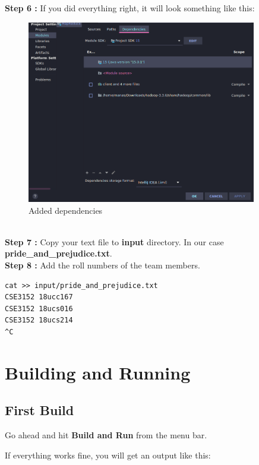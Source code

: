 \documentclass[10pt]{report}
\begin{document}
\textbf{Step 6 :} If you did everything right, it will look something like this:
\begin{figure}[h]
        \includegraphics[height=8cm]{dependency.png}
        \centering
        \caption{Added dependencies}
        \centering
\end{figure}
\\

\textbf{Step 7 :} Copy your text file to \textbf{input} directory. In our case \textbf{pride\_and\_prejudice.txt}.
\\

\textbf{Step 8 :} Add the roll numbers of the team members.

\begin{verbatim}
cat >> input/pride_and_prejudice.txt
CSE3152 18ucc167
CSE3152 18ucs016
CSE3152 18ucs214
^C
\end{verbatim}
\clearpage

\section{Building and Running}
\subsection{First Build}

Go ahead and hit \textbf{Build and Run} from the menu bar.

If everything works fine, you will get an output like this:
\end{document}
